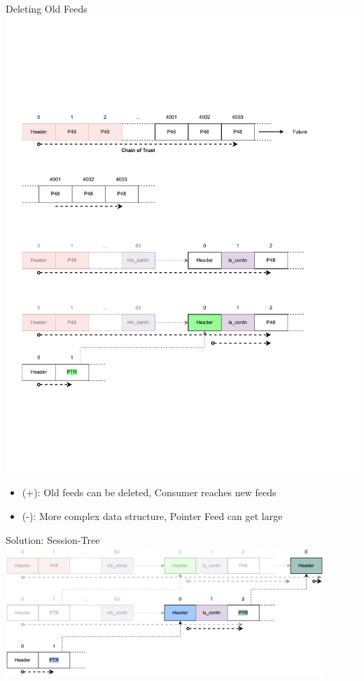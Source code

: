 \documentclass[aspectratio=169]{beamer}
\begin{document}
\begin{frame}[c]{Deleting Old Feeds}
\includegraphics[width=1\textwidth]{images/session_4.pdf}
\begin{itemize}
	\item (+): Old feeds can be deleted, Consumer reaches new feeds
	\item (-): More complex data structure, Pointer Feed can get large
\end{itemize}
\end{frame}

\begin{frame}[c]{Solution: Session-Tree}
\includegraphics[width=0.9\textwidth]{images/session_5i.png}      
\end{frame}
\end{document}
